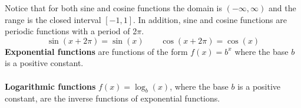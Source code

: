 \begin{center}
\end{center}
Notice that for both sine and cosine functions the domain is \((-\infty, \infty)\) and the range is the closed interval \([-1, 1]\). In addition, sine and cosine functions are periodic functions with a period of 2\(\pi\). 
$$\sin(x+2\pi)=\sin(x) \quad \quad \cos(x+2\pi)=\cos(x)$$
\textbf{Exponential functions} are functions of the form \(f(x)=b^x\) where the base \(b\) is a positive constant.
\\\\
\textbf{Logarithmic functions} \(f(x)=\log_b(x)\), where the base \(b\) is a positive constant, are the inverse functions of exponential functions.
